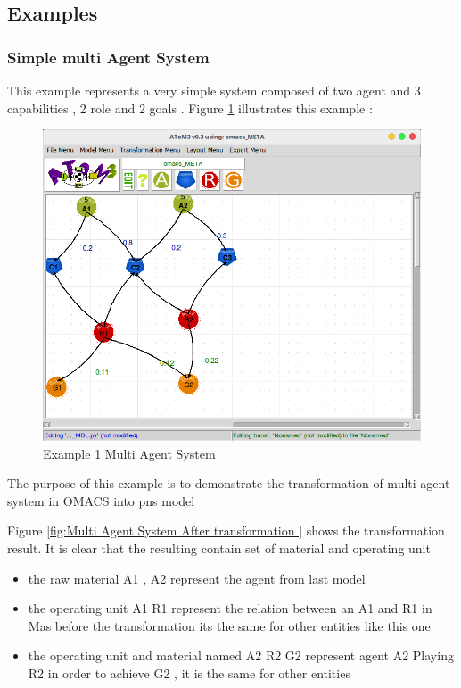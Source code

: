 \pagebreak
\subsection{ Examples }

\subsubsection{ Simple multi Agent System }
This example represents a very simple system composed of  two agent and 3 capabilities , 2 role and 2 goals  .
 Figure \ref{fig:Example 1 Multi Agent System } illustrates this example :
\begin{figure}[th]
	\centering
 	\includegraphics[scale=0.5]{chapiter3/img/ex1omacs}
	\caption{\label{fig:Example 1 Multi Agent System }Example 1 Multi Agent System}
\end{figure} 


The purpose of this example is to demonstrate the transformation of multi agent system in OMACS into pns model

Figure \ref{fig:Multi Agent System After transformation } shows the transformation result.
It is clear that the resulting contain set of material and operating unit
\begin{itemize}
\item the raw material A1 , A2 represent the agent from last model
\item the operating unit A1 R1 represent the relation between an A1 and R1 
in Mas before the transformation its the same for other entities like this one
\item the operating unit and material named A2 R2 G2 represent agent A2 Playing R2 in order to achieve G2 , it is the same for other entities  
\end{itemize}

